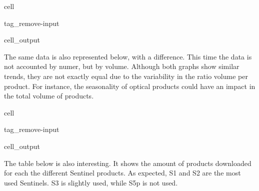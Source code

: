\documentclass[letterpaper,10pt,english]{jupyterBook}
\begin{document}
\begin{sphinxuseclass}{cell}
\begin{sphinxuseclass}{tag_remove-input}\begin{sphinxVerbatimOutput}

\begin{sphinxuseclass}{cell_output}
\noindent{}

\end{sphinxuseclass}\end{sphinxVerbatimOutput}

\end{sphinxuseclass}
\end{sphinxuseclass}
\sphinxAtStartPar
The same data is also represented below, with a difference. This time the data is not accounted by numer, but by volume. Although both graphs show similar trends, they are not exactly equal due to the variability in the ratio volume per product. For instance, the seasonality of optical products could have an impact in the total volume of products.

\begin{sphinxuseclass}{cell}
\begin{sphinxuseclass}{tag_remove-input}\begin{sphinxVerbatimOutput}

\begin{sphinxuseclass}{cell_output}
\noindent{}

\end{sphinxuseclass}\end{sphinxVerbatimOutput}

\end{sphinxuseclass}
\end{sphinxuseclass}
\sphinxAtStartPar
The table below is also interesting. It shows the amount of products downloaded for each the different Sentinel products. As expected, S1 and S2 are the most used Sentinels. S3 is slightly used, while S5p is not used.
\end{document}
